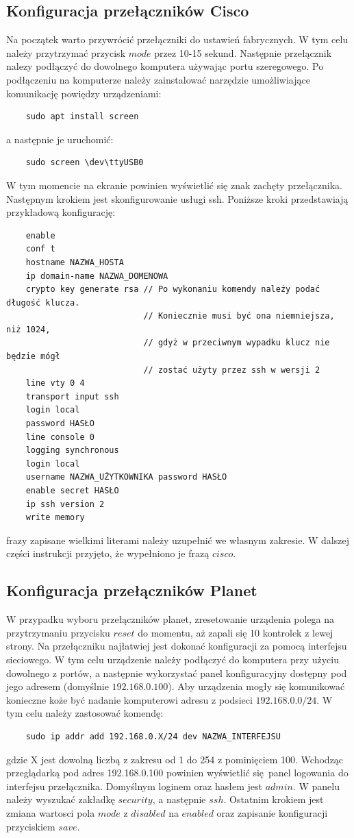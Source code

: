 \documentclass[polish,envcountsect,10pt]{article}
\begin{document}
\subsection{Konfiguracja przełączników Cisco}

Na początek warto przywrócić przełączniki do ustawień fabrycznych. W tym celu należy przytrzymać przycisk $mode$ przez 10-15 sekund. Następnie przełącznik nalezy podłączyć do dowolnego komputera używając portu szeregowego. Po podłączeniu na komputerze należy zainstalować narzędzie umożliwiające komunikację powiędzy urządzeniami:
\begin{verbatim}
	sudo apt install screen
\end{verbatim}
a następnie je uruchomić:
\begin{verbatim}
	sudo screen \dev\ttyUSB0
\end{verbatim}
W tym momencie na ekranie powinien wyświetlić się znak zachęty przełącznika. Następnym krokiem jest skonfigurowanie usługi ssh. Poniższe kroki przedstawiają przykładową konfigurację:
\begin{verbatim}
	enable
	conf t
	hostname NAZWA_HOSTA
	ip domain-name NAZWA_DOMENOWA
	crypto key generate rsa // Po wykonaniu komendy należy podać długość klucza.
	                        // Koniecznie musi być ona niemniejsza, niż 1024,
	                        // gdyż w przeciwnym wypadku klucz nie będzie mógł
	                        // zostać użyty przez ssh w wersji 2
	line vty 0 4
	transport input ssh
	login local
	password HASŁO
	line console 0
	logging synchronous
	login local
	username NAZWA_UŻYTKOWNIKA password HASŁO
	enable secret HASŁO
	ip ssh version 2
	write memory
\end{verbatim}
frazy zapisane wielkimi literami należy uzupełnić we własnym zakresie. W dalszej części instrukcji przyjęto, że wypełniono je frazą $cisco$.

\subsection{Konfiguracja przełączników Planet}

W przypadku wyboru przełączników planet, zresetowanie urządenia polega na przytrzymaniu przycisku $reset$ do momentu, aż zapali się 10 kontrolek z lewej strony. Na przełączniku najłatwiej jest dokonać konfiguracji za pomocą interfejsu sieciowego. W tym celu urządzenie należy podłączyć do komputera przy użyciu dowolnego z portów, a następnie wykorzystać panel konfiguracyjny dostępny pod jego adresem (domyślnie $192.168.0.100$). Aby urządzenia mogły się komunikować konieczne koże być nadanie komputerowi adresu z podsieci $192.168.0.0/24$. W tym celu należy zastosować komendę:
\begin{verbatim}
	sudo ip addr add 192.168.0.X/24 dev NAZWA_INTERFEJSU
\end{verbatim}
gdzie X jest dowolną liczbą z zakresu od 1 do 254 z pominięciem 100. Wchodząc przeglądarką pod adres 192.168.0.100 powinien wyświetlić się panel logowania do interfejsu przełącznika. Domyślnym loginem oraz hasłem jest $admin$. W panelu należy wyszukać zakładkę $security$, a następnie $ssh$. Ostatnim krokiem jest zmiana wartosci pola $mode$ z $disabled$ na $enabled$ oraz zapisanie konfiguracji przyciskiem $save$.
\end{document}
